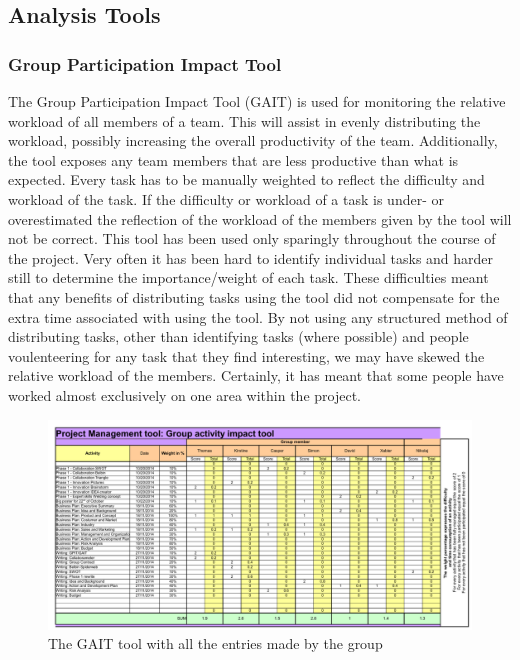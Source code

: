 
\subsection{Analysis Tools}
\subsubsection{Group Participation Impact Tool}
 The Group Participation Impact Tool (GAIT) is used for monitoring the relative workload of all members of a team. This will assist in evenly distributing the workload, possibly increasing the overall productivity of the team. Additionally, the tool exposes any team members that are less productive than what is expected. Every task has to be manually weighted to reflect the difficulty and workload of the task. If the difficulty or workload of a task is under- or overestimated the reflection of the workload of the members given by the tool will not be correct.
This tool has been used only sparingly throughout the course of the project. Very often it has been hard to identify individual tasks and harder still to determine the importance/weight of each task. These difficulties meant that any benefits of distributing tasks using the tool did not compensate for the extra time associated with using the tool. 
 By not using any structured method of distributing tasks, other than identifying tasks (where possible) and people voulenteering for any task that they find interesting, we may have skewed the relative workload of the members. Certainly, it has meant that some people have worked almost exclusively on one area within the project.



\begin{landscape}
	\begin{figure}[h!]
		\includegraphics[scale=1.25]{./graphics/GAIT}
		\caption{The GAIT tool with all the entries made by the group}
		\label{fig:GAIT}
	\end{figure}
\end{landscape}




